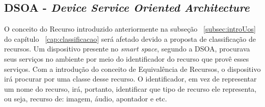 \subsection{DSOA - \emph{Device Service Oriented Architecture}}

O conceito do Recurso introduzido anteriormente na subseção ~\ref{subsec:introUos} do capítulo ~\ref{cap:classificacao} será afetado devido a proposta de classificação de recursos. Um dispositivo presente no \emph{smart space}, segundo a DSOA, procurava seus serviços no ambiente por meio do identificador do recurso que provê esses serviços. Com a introdução do conceito de Equivalência de Recursos, o dispositivo irá procurar por uma classe desse recurso. O identificador, em vez de representar um nome do recurso, irá, portanto, identificar que tipo de recurso ele representa, ou seja, recurso de: imagem, áudio, apontador e etc.